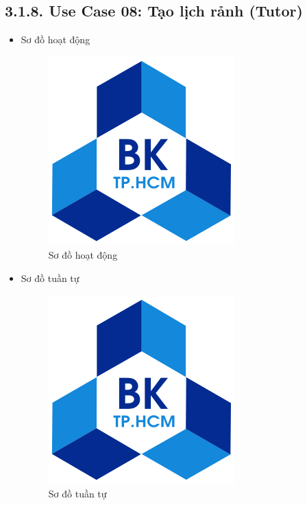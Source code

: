 \subsection*{3.1.8. Use Case 08: Tạo lịch rảnh (Tutor)}
\begin{itemize}
    \item Sơ đồ hoạt động
    \begin{figure}[H]
    \centering
    \includegraphics[scale=0.5 ]{Picture/hcmut.png}
    \caption{Sơ đồ hoạt động }
    \end{figure}
    \item Sơ đồ tuần tự
    \begin{figure}[H]
    \centering
    \includegraphics[scale=0.5 ]{Picture/hcmut.png}
    \caption{Sơ đồ tuần tự }
    \end{figure}
\end{itemize}
